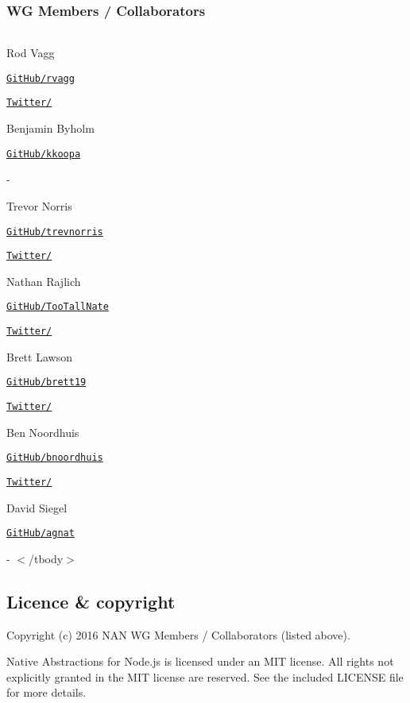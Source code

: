 \label{_collaborators}%
 \subsubsection*{WG Members / Collaborators}

\tabulinesep=1mm
\begin{longtabu} spread 0pt [c]{*{0}{|X[-1]}|}
\hline
\end{longtabu}


Rod Vagg

\href{https://github.com/rvagg}{\tt Git\+Hub/rvagg}

\href{http://twitter.com/rvagg}{\tt Twitter/} 

Benjamin Byholm

\href{https://github.com/kkoopa/}{\tt Git\+Hub/kkoopa}

-\/ 

Trevor Norris

\href{https://github.com/trevnorris}{\tt Git\+Hub/trevnorris}

\href{http://twitter.com/trevnorris}{\tt Twitter/} 

Nathan Rajlich

\href{https://github.com/TooTallNate}{\tt Git\+Hub/\+Too\+Tall\+Nate}

\href{http://twitter.com/TooTallNate}{\tt Twitter/} 

Brett Lawson

\href{https://github.com/brett19}{\tt Git\+Hub/brett19}

\href{http://twitter.com/brett19x}{\tt Twitter/} 

Ben Noordhuis

\href{https://github.com/bnoordhuis}{\tt Git\+Hub/bnoordhuis}

\href{http://twitter.com/bnoordhuis}{\tt Twitter/} 

David Siegel

\href{https://github.com/agnat}{\tt Git\+Hub/agnat}

-\/ $<$/tbody$>$

\subsection*{Licence \& copyright}

Copyright (c) 2016 N\+AN WG Members / Collaborators (listed above).

Native Abstractions for Node.\+js is licensed under an M\+IT license. All rights not explicitly granted in the M\+IT license are reserved. See the included L\+I\+C\+E\+N\+SE file for more details. 